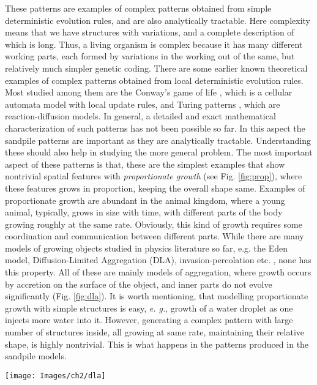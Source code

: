 \documentclass[11pt,a4paper]{book}
\begin{document}
These patterns are examples of complex patterns obtained from simple deterministic 
evolution rules, and are also analytically tractable.
Here complexity means that we have structures with variations, and a
complete description of which is long. Thus,
a living organism is complex because it has many different working
parts, each formed by variations in the working out of the same, but
relatively much simpler genetic coding. There are some earlier known
theoretical examples of
complex patterns obtained from local deterministic evolution rules.
Most studied among them are the
Conway's game of life \cite{earlierone}, which is a cellular automata
model with local update rules, and Turing patterns \cite{earliertwo}, which are
reaction-diffusion models. In general, a detailed and exact 
mathematical characterization of such patterns has not been possible so 
far. In this aspect the sandpile patterns are important as they are
analytically tractable. Understanding these should also help in studying the more general 
problem.
The most important aspect of these patterns is that, these are the simplest examples that show nontrivial spatial 
features with {\it proportionate growth} (see Fig. \ref{fig:prop}),
where these features grows in proportion, keeping the overall shape
same.
Examples of proportionate
growth are abundant in the animal kingdom, where a 
young animal, typically, grows in size with time,
with different parts of the body growing roughly at the same rate. 
Obviously, this kind of growth requires some coordination and communication 
between different parts.
While there are many models of growing objects studied in 
physics literature so far, e.g. the Eden model, Diffusion-Limited 
Aggregation (DLA), invasion-percolation etc. \cite{herrmann}, none has this
property. All of these are 
mainly models of aggregation, where growth occurs by accretion on the 
surface of the object, and inner parts do not evolve significantly
(Fig. \ref{fig:dla}). It is worth mentioning, that modelling proportionate
growth with simple structures is easy, \textit{e. g.}, growth of a
water droplet as one injects more water into it. However, generating a
complex pattern with large number of structures inside, all growing at
same rate, maintaining their relative shape, is highly nontrivial.
This is what happens in the patterns produced in the sandpile models.
\begin{SCfigure}
\texttt{[image: Images/ch2/dla]}
\caption{Growth in a DLA occurs by accretion of particles, doing random
walk, and attaching to the cluster connected to the origin, when it
comes close to it. }
\label{fig:dla}
\end{SCfigure}
\end{document}
